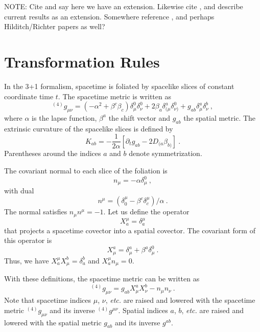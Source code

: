 \documentclass[letterpaper,nofootinbib,prd,amsmath,onecolumn]{revtex4-1}
\begin{document}
NOTE:
Cite \cite{Brown:2009dd} and say here we have an extension. Likewise cite \cite{Brown:2011qg}, and describe current results as an extension. 
Somewhere reference \cite{Brown:2008cca}, and perhaps Hilditch/Richter papers as well?
\section{Transformation Rules}\label{transform}
In the 3+1 formalism, spacetime is foliated by spacelike slices of constant coordinate time $t$. The spacetime metric is written as 
\begin{equation}\label{sptmgin3+1form}
	{}^{(4)}g_{\mu\nu} = (-\alpha^2 + \beta^{c}\beta_{c})\delta_\mu^0\delta_\nu^0 
	+ 2\beta_{a}\delta_{(\mu}^a\delta_{\nu)}^0 + g_{ab} \delta^a_\mu \delta^b_\nu \ ,
\end{equation}
where $\alpha$ is the lapse function, $\beta^{a}$ the shift vector and $g_{ab}$ the spatial metric. 
The extrinsic curvature of the spacelike slices is defined by
\begin{equation}\label{extrinsic}
K_{ab} = - \frac{1}{2\alpha}\left[\partial_{t}g_{ab} - 2D_{(a}\beta_{b)}\right] \ .
\end{equation}
Parentheses around the indices $a$ and $b$ denote symmetrization. 

The covariant normal to each slice of the foliation is  
\begin{equation}\label{normal covector}
n_{\mu} = -\alpha\delta^{0}_{\mu} \ ,
\end{equation}
with dual 
\begin{equation}\label{normal vector}
n^{\mu} = (\delta^{\mu}_{0} - \beta^{c}\delta^{\mu}_{c})/\alpha \ .
\end{equation}
The normal satisfies $n_{\mu}n^{\mu} = -1$. Let us define the operator
\begin{equation}\label{projection 1}
X^{\mu}_{a} = \delta^{\mu}_{a}
\end{equation}
that projects a spacetime covector into a spatial covector. The covariant form of this operator is
\begin{equation}\label{projection 2}
X^{a}_{\mu} = \delta^{a}_{\mu} + \beta^{a}\delta^{0}_{\mu} \ .
\end{equation}
Thus, we have $X^{\mu}_{a}X^{b}_{\mu} = \delta^{b}_{a}$ and $X^{\mu}_{a}n_{\mu} = 0$. 

With these definitions, the spacetime metric can be written  as
\begin{equation}\label{spacetime metric 3+1}
^{(4)}g_{\mu\nu} = g_{ab}X^{a}_{\mu}X^{b}_{\nu} - n_{\mu}n_{\nu} \ .
\end{equation}
Note that spacetime indices $\mu$, $\nu$, {\em etc.} are raised and lowered with the spacetime metric $^{(4)}g_{\mu\nu}$ and its inverse $^{(4)}g^{\mu\nu}$. 
Spatial indices $a$, $b$, {\em etc.} are raised and lowered with the spatial metric $g_{ab}$ and its inverse $g^{ab}$. 
\end{document}
